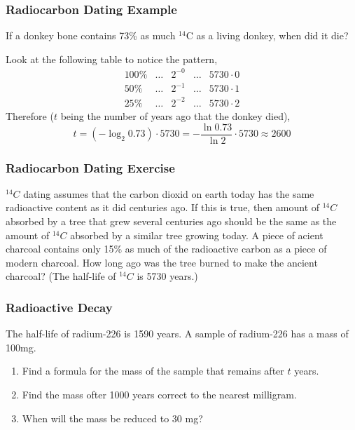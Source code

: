 \documentclass[xcolor=dvipsnames]{beamer}
\begin{document}
\begin{frame}
  \frametitle{Radiocarbon Dating Example}
If a donkey bone contains 73\% as much $^{14}$C as a living donkey,
when did it die?

\medskip

Look at the following table to notice the pattern,
\begin{equation}
  \label{eq:sayeeziu}
  \begin{array}{rcccl}
        100\% & \ldots & 2^{-0} & \ldots & 5730\cdot{}0 \\
        50\% & \ldots & 2^{-1} & \ldots & 5730\cdot{}1 \\
        25\% & \ldots & 2^{-2} & \ldots & 5730\cdot{}2
  \end{array}
\end{equation}
Therefore ($t$ being the number of years ago that the donkey died),
\begin{equation}
  \label{eq:anuvuama}
  t=\left(-\log_{2}0.73\right)\cdot{}5730=-\frac{\ln{}0.73}{\ln{}2}\cdot{}5730\approx{}2600
\end{equation}
\end{frame}

\begin{frame}
  \frametitle{Radiocarbon Dating Exercise}
  $^{14}C$ dating assumes that the carbon dioxid on earth today has
  the same radioactive content as it did centuries ago. If this is
  true, then amount of $^{14}C$ absorbed by a tree that grew several
  centuries ago should be the same as the amount of $^{14}C$ absorbed
  by a similar tree growing today. A piece of acient charcoal contains
  only 15\% as much of the radioactive carbon as a piece of modern
  charcoal. How long ago was the tree burned to make the ancient
  charcoal? (The half-life of $^{14}C$ is 5730 years.)
\end{frame}

\begin{frame}
  \frametitle{Radioactive Decay}
The half-life of radium-226 is 1590 years. A sample of radium-226 has
a mass of 100mg. 
\begin{enumerate}
\item<1-> Find a formula for the mass of the sample that
remains after $t$ years.
\item<2-> Find the mass ofter 1000 years correct to the nearest
  milligram.
\item<3-> When will the mass be reduced to 30 mg?
\end{enumerate}
\end{frame}
\end{document}
